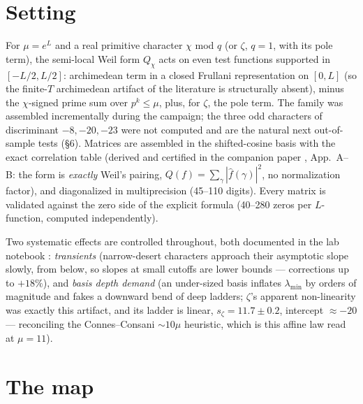 \documentclass[10pt]{article}
\begin{document}
\section{Setting}

For $\mu=e^L$ and a real primitive character $\chi$ mod $q$ (or $\zeta$,
$q=1$, with its pole term), the semi-local Weil form $Q_\chi$ acts on
even test functions supported in $[-L/2,L/2]$: archimedean term in a
closed Frullani representation on $[0,L]$ (so the finite-$T$ archimedean
artifact of the literature is structurally absent), minus the
$\chi$-signed prime sum over $p^k\le\mu$, plus, for $\zeta$, the pole
term. The family was assembled incrementally during the campaign; the three
odd characters of discriminant $-8,-20,-23$ were not computed and are
the natural next out-of-sample tests (\S6). Matrices are assembled in
the shifted-cosine basis with the exact
correlation table (derived and certified in the companion paper
\cite{Quorum}, App.~A--B: the form is \emph{exactly} Weil's pairing,
$Q(f)=\sum_\gamma|\hat f(\gamma)|^2$, no normalization factor), and
diagonalized in multiprecision (45--110 digits). Every matrix is
validated against the zero side of the explicit formula (40--280 zeros
per $L$-function, computed independently).

Two systematic effects are
controlled throughout, both documented in the lab notebook
\cite{LabNB}: \emph{transients} (narrow-desert characters approach their
asymptotic slope slowly, from below, so slopes at small cutoffs are
lower bounds --- corrections up to $+18\%$), and \emph{basis depth
demand} (an under-sized basis inflates $\lambda_{\min}$ by orders of
magnitude and fakes a downward bend of deep ladders; $\zeta$'s apparent
non-linearity was exactly this artifact, and its ladder is linear,
$s_\zeta=11.7\pm0.2$, intercept $\approx-20$ --- reconciling the
Connes--Consani $\sim\!10\mu$ heuristic, which is this affine law read at
$\mu=11$).

\section{The map}
\end{document}
